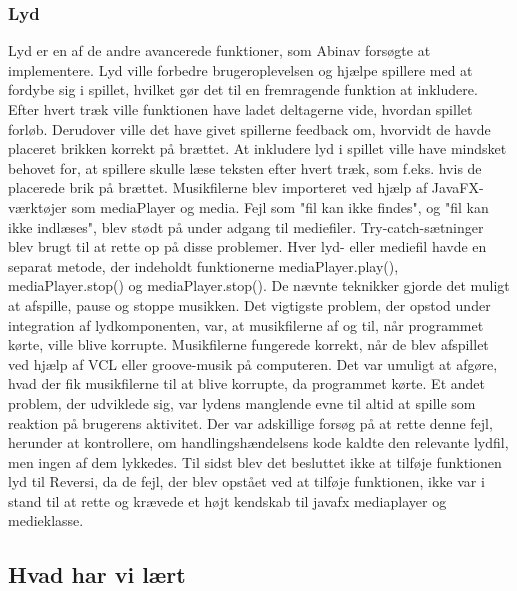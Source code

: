\subsubsection{Lyd}\label{lyd}
Lyd er en af de andre avancerede funktioner, som Abinav forsøgte at implementere. Lyd ville forbedre brugeroplevelsen og hjælpe spillere med at fordybe sig i spillet, hvilket gør det til en fremragende funktion at inkludere. Efter hvert træk ville funktionen have ladet deltagerne vide, hvordan spillet forløb. Derudover ville det have givet spillerne feedback om, hvorvidt de havde placeret brikken korrekt på brættet. At inkludere lyd i spillet ville have mindsket behovet for, at spillere skulle læse teksten efter hvert træk, som f.eks. hvis de placerede brik på brættet.
Musikfilerne blev importeret ved hjælp af JavaFX-værktøjer som mediaPlayer og media. Fejl som "fil kan ikke findes", og "fil kan ikke indlæses", blev stødt på under adgang til mediefiler. Try-catch-sætninger blev brugt til at rette op på disse problemer. Hver lyd- eller mediefil havde en separat metode, der indeholdt funktionerne mediaPlayer.play(), mediaPlayer.stop() og mediaPlayer.stop(). De nævnte teknikker gjorde det muligt at afspille, pause og stoppe musikken. Det vigtigste problem, der opstod under integration af lydkomponenten, var, at musikfilerne af og til, når programmet kørte, ville blive korrupte. Musikfilerne fungerede korrekt, når de blev afspillet ved hjælp af VCL eller groove-musik på computeren. Det var umuligt at afgøre, hvad der fik musikfilerne til at blive korrupte, da programmet kørte. Et andet problem, der udviklede sig, var lydens manglende evne til altid at spille som reaktion på brugerens aktivitet. Der var adskillige forsøg på at rette denne fejl, herunder at kontrollere, om handlingshændelsens kode kaldte den relevante lydfil, men ingen af dem lykkedes. Til sidst blev det besluttet ikke at tilføje funktionen lyd til Reversi, da de fejl, der blev opstået ved at tilføje funktionen, ikke var i stand til at rette og krævede et højt kendskab til javafx mediaplayer og medieklasse.


\subsection{Hvad har vi lært}
